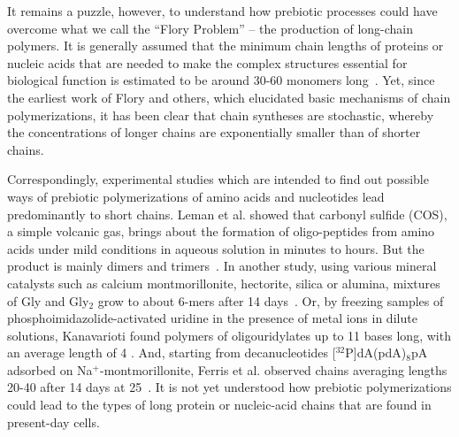 \documentclass[journal=jacsat,manuscript=article,layout=twocolumn]{achemso}
\begin{document}
It remains a puzzle, however, to understand how prebiotic processes could have overcome what 
we call the ``Flory Problem'' -- the production of long-chain polymers.  It is generally assumed 
that the minimum chain lengths of proteins or nucleic acids that are needed to make the complex 
structures essential for biological function is estimated to be around 30-60 monomers 
long~\cite{Szostak1993}.  Yet, since the earliest work of Flory and others, which elucidated basic 
mechanisms of chain polymerizations, it has been clear that chain syntheses are stochastic, whereby 
the concentrations of longer chains are exponentially smaller than of shorter chains. 

Correspondingly, experimental studies which are intended to find out possible ways of prebiotic 
polymerizations of amino acids and nucleotides lead predominantly to short chains. Leman et al. 
showed that carbonyl sulfide (COS), a simple volcanic gas, brings about the formation of 
oligo-peptides from amino acids under mild conditions in aqueous solution in minutes to hours. But 
the product is mainly dimers and trimers~\cite{Leman2004a}.  In another study, using various 
mineral 
catalysts such as calcium montmorillonite, hectorite, silica or alumina, mixtures of Gly and 
Gly$_2$ 
grow to about 6-mers after 14 days~\cite{Rode1997,Rode1999}.  Or, by freezing samples of 
phosphoimidazolide-activated uridine in the presence of metal ions in dilute solutions, Kanavarioti 
found polymers of oligouridylates up to 11 bases long, with an average length of 4 
\cite{Kanavarioti2001}.  And, starting from decanucleotides [$^{32}$P]dA(pdA)$_8$pA adsorbed on 
Na$^+$-montmorillonite, Ferris et al. observed chains averaging lengths 20-40 after 14 days at 
25\textcelsius\ \cite{Ferris1996}.  It is not yet understood how prebiotic polymerizations could 
lead to the types of long protein or nucleic-acid chains that are found in present-day cells.
\end{document}
